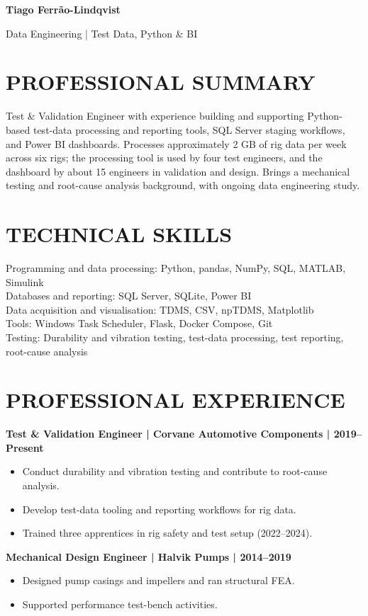 \documentclass[11pt,a4paper]{article}
\begin{document}
{\centering
{\Huge\bfseries\color{primarycolor} Tiago Ferrão-Lindqvist}\par
{\large\color{accentcolor} Data Engineering | Test Data, Python \& BI}\par
}

\section*{PROFESSIONAL SUMMARY}
Test \& Validation Engineer with experience building and supporting Python-based test-data processing and reporting tools, SQL Server staging workflows, and Power BI dashboards. Processes approximately 2 GB of rig data per week across six rigs; the processing tool is used by four test engineers, and the dashboard by about 15 engineers in validation and design. Brings a mechanical testing and root-cause analysis background, with ongoing data engineering study.

\section*{TECHNICAL SKILLS}
Programming and data processing: Python, pandas, NumPy, SQL, MATLAB, Simulink\\
Databases and reporting: SQL Server, SQLite, Power BI\\
Data acquisition and visualisation: TDMS, CSV, npTDMS, Matplotlib\\
Tools: Windows Task Scheduler, Flask, Docker Compose, Git\\
Testing: Durability and vibration testing, test-data processing, test reporting, root-cause analysis

\section*{PROFESSIONAL EXPERIENCE}
\textbf{Test \& Validation Engineer | Corvane Automotive Components | 2019–Present}
\begin{itemize}
\item Conduct durability and vibration testing and contribute to root-cause analysis.
\item Develop test-data tooling and reporting workflows for rig data.
\item Trained three apprentices in rig safety and test setup (2022–2024).
\end{itemize}

\textbf{Mechanical Design Engineer | Halvik Pumps | 2014–2019}
\begin{itemize}
\item Designed pump casings and impellers and ran structural FEA.
\item Supported performance test-bench activities.
\end{itemize}
\end{document}
